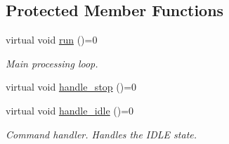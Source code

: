 \subsection*{Protected Member Functions}
\begin{DoxyCompactItemize}
\item 
\hypertarget{class_threaded_a585d28f8e23a343428f62e0479dda13c}{
virtual void \hyperlink{class_threaded_a585d28f8e23a343428f62e0479dda13c}{run} ()=0}
\label{class_threaded_a585d28f8e23a343428f62e0479dda13c}

\begin{DoxyCompactList}\small\item\em Main processing loop. \end{DoxyCompactList}\item 
virtual void \hyperlink{class_threaded_a421b31c46443970af90b8fa1df8ea141}{handle\_\-stop} ()=0
\item 
\hypertarget{class_threaded_aff05e9339cefd2099cc8a6f02ae24b5f}{
virtual void \hyperlink{class_threaded_aff05e9339cefd2099cc8a6f02ae24b5f}{handle\_\-idle} ()=0}
\label{class_threaded_aff05e9339cefd2099cc8a6f02ae24b5f}

\begin{DoxyCompactList}\small\item\em Command handler. Handles the IDLE state. \end{DoxyCompactList}\end{DoxyCompactItemize}
